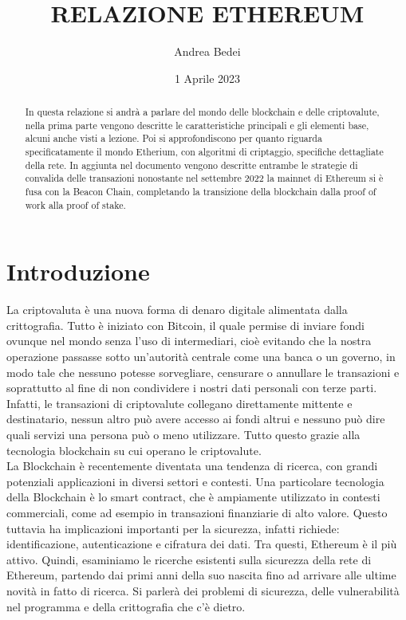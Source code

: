 \documentclass[a4paper,11pt]{report}
\title{\Huge RELAZIONE ETHEREUM}
\author{Andrea Bedei}
\date{1 Aprile 2023}
\begin{document}
\maketitle
\tableofcontents
\listoffigures

\begin{abstract}%
In questa relazione si andrà a parlare del mondo delle blockchain e delle criptovalute, nella prima parte vengono descritte le caratteristiche principali e gli elementi base, alcuni anche visti a lezione. Poi si approfondiscono per quanto riguarda specificatamente il mondo Etherium, con algoritmi di criptaggio, specifiche dettagliate della rete. In aggiunta nel documento vengono descritte entrambe le strategie di convalida delle transazioni nonostante nel settembre 2022 la mainnet di Ethereum si è fusa con la Beacon Chain, completando la transizione della blockchain dalla proof of work alla proof of stake.
\end{abstract}

\chapter{Introduzione}
La criptovaluta è una nuova forma di denaro digitale alimentata dalla crittografia. Tutto è iniziato con Bitcoin, il quale permise di inviare fondi ovunque nel mondo senza l'uso di intermediari, cioè evitando che la nostra operazione passasse sotto un'autorità centrale come una banca o un governo, in modo tale che nessuno potesse sorvegliare, censurare o annullare le transazioni e soprattutto al fine di non condividere i nostri dati personali con terze parti.
Infatti, le transazioni di criptovalute collegano direttamente mittente e destinatario, nessun altro può avere accesso ai fondi altrui e nessuno può dire quali servizi una persona può o meno utilizzare. Tutto questo grazie alla tecnologia blockchain su cui operano le criptovalute.\\
La Blockchain è recentemente diventata una tendenza di ricerca, con grandi potenziali applicazioni in diversi settori e contesti. Una particolare tecnologia della Blockchain è lo smart contract, che è ampiamente utilizzato in contesti commerciali, come ad esempio in transazioni finanziarie di alto valore. Questo tuttavia ha implicazioni importanti per la sicurezza, infatti richiede: identificazione, autenticazione e cifratura dei dati. Tra questi, Ethereum è il più attivo. Quindi, esaminiamo le ricerche esistenti sulla sicurezza della rete di Ethereum, partendo dai primi anni della suo nascita fino ad arrivare alle ultime novità in fatto di ricerca. Si parlerà dei problemi di sicurezza, delle vulnerabilità nel programma e della crittografia che c'è dietro.
\end{document}
